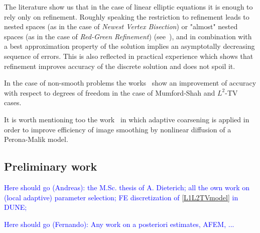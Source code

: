 \documentclass[enabledeprecatedfontcommands,cleardoublepage=empty,headsepline,twoside,11pt,DIV=15,BCOR=12mm,final]{scrartcl}
\begin{document}
The literature show us that in the case of linear elliptic equations it is enough to rely only on refinement. Roughly speaking the restriction to refinement leads to nested spaces (as in the case of \emph{Newest Vertex Bisection}) or "almost" nested spaces (as in the case of \emph{Red-Green Refinement}) (see~\cite{Verfurth:96}), and in combination with a best approximation property of the solution implies an asymptotally decreasing sequence of errors. This is also reflected in practical experience which shows that refinement improves accuracy of the discrete solution and does not spoil it.

In the case  of non-smooth problems the works~\cite{GuMoNo,Bar2015} show an improvement of accuracy with respect to degrees of freedom in the case of Mumford-Shah and $L^2$-TV cases. %

It is worth mentioning too  the work~\cite{BaeMik} in which adaptive coarsening is applied in order to improve efficiency of image smoothing by nonlinear diffusion of a Perona-Malik model.




\subsection{Preliminary work}\label{sec:prelim}

\textcolor{blue}{Here should go (Andreas): the M.Sc. thesis of A. Dieterich; all the own work on (local adaptive) parameter selection; FE discretization of \eqref{L1L2TVmodel} in DUNE; }

\textcolor{blue}{Here should go (Fernando): Any work on a posteriori estimates, AFEM, ...}
\end{document}

